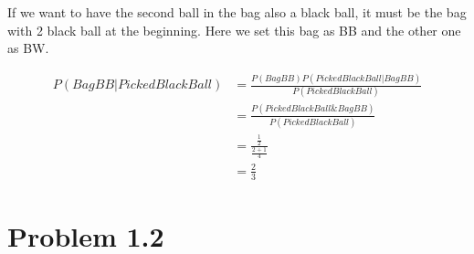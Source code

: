 \documentclass{article}
\begin{document}
If we want to have the second ball in the bag also a black ball, it must be the bag with 2 black ball at the beginning. Here we set this bag as BB and the other one as BW.

\begin{equation}
    \begin{split}
        P(Bag BB \vert Picked Black Ball) &= \frac{P(Bag BB)P(Picked Black Ball \vert Bag BB)}{P(Picked Black Ball)} \\
        &= \frac{P(Picked Black Ball \& Bag BB)}{P(Picked Black Ball)} \\
        &= \frac{\frac{1}{2}}{\frac{2 + 1}{4}} \\
        &= \frac{2}{3}
    \end{split}
\end{equation}

\section{Problem 1.2}
\end{document}

